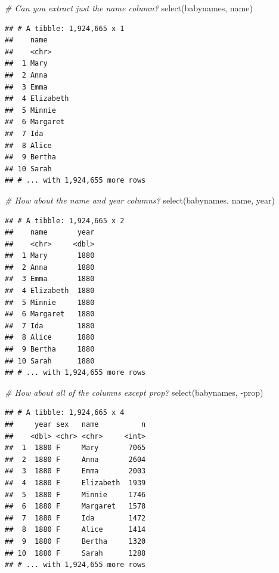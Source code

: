 \documentclass[
]{article}
\newenvironment{Shaded}{\begin{snugshade}}{\end{snugshade}}
\newcommand{\CommentTok}[1]{\textcolor[rgb]{0.56,0.35,0.01}{\textit{#1}}}
\newcommand{\FunctionTok}[1]{\textcolor[rgb]{0.00,0.00,0.00}{#1}}
\newcommand{\NormalTok}[1]{#1}
\newcommand{\SpecialCharTok}[1]{\textcolor[rgb]{0.00,0.00,0.00}{#1}}
\begin{document}
\begin{Shaded}
\begin{Highlighting}[]
\CommentTok{\# Can you extract just the name column?}
\FunctionTok{select}\NormalTok{(babynames, name)}
\end{Highlighting}
\end{Shaded}

\begin{verbatim}
## # A tibble: 1,924,665 x 1
##    name     
##    <chr>    
##  1 Mary     
##  2 Anna     
##  3 Emma     
##  4 Elizabeth
##  5 Minnie   
##  6 Margaret 
##  7 Ida      
##  8 Alice    
##  9 Bertha   
## 10 Sarah    
## # ... with 1,924,655 more rows
\end{verbatim}

\begin{Shaded}
\begin{Highlighting}[]
\CommentTok{\# How about the name and year columns?}
\FunctionTok{select}\NormalTok{(babynames, name, year)}
\end{Highlighting}
\end{Shaded}

\begin{verbatim}
## # A tibble: 1,924,665 x 2
##    name       year
##    <chr>     <dbl>
##  1 Mary       1880
##  2 Anna       1880
##  3 Emma       1880
##  4 Elizabeth  1880
##  5 Minnie     1880
##  6 Margaret   1880
##  7 Ida        1880
##  8 Alice      1880
##  9 Bertha     1880
## 10 Sarah      1880
## # ... with 1,924,655 more rows
\end{verbatim}

\begin{Shaded}
\begin{Highlighting}[]
\CommentTok{\# How about all of the columns except prop?}
\FunctionTok{select}\NormalTok{(babynames, }\SpecialCharTok{{-}}\NormalTok{prop)}
\end{Highlighting}
\end{Shaded}

\begin{verbatim}
## # A tibble: 1,924,665 x 4
##     year sex   name          n
##    <dbl> <chr> <chr>     <int>
##  1  1880 F     Mary       7065
##  2  1880 F     Anna       2604
##  3  1880 F     Emma       2003
##  4  1880 F     Elizabeth  1939
##  5  1880 F     Minnie     1746
##  6  1880 F     Margaret   1578
##  7  1880 F     Ida        1472
##  8  1880 F     Alice      1414
##  9  1880 F     Bertha     1320
## 10  1880 F     Sarah      1288
## # ... with 1,924,655 more rows
\end{verbatim}
\end{document}
